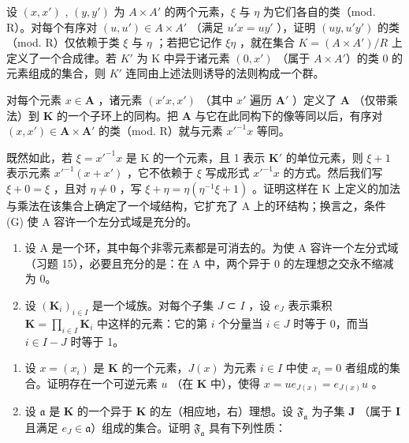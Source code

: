 设 \((x, x')\) , \((y, y')\) 为 \(A \times A'\) 的两个元素，\(\xi\) 与 \(\eta\) 为它们各自的类（mod. R）。对每个有序对 \((u, u') \in A \times A'\) （满足 \(u'x = uy'\) ），证明 \((uy, u'y')\) 的类（mod. R）仅依赖于类 \(\xi\) 与 \(\eta\) ；若把它记作 \(\xi\eta\) ，就在集合 \(K = (A \times A')/R\) 上定义了一个合成律。若 \(K'\) 为 K 中异于诸元素 \((0, x')\) （属于 \(A \times A'\)）的类 0 的元素组成的集合，则 \(K'\) 连同由上述法则诱导的法则构成一个群。

对每个元素 \(x \in \mathbf{A}\) ，诸元素 \((x'x, x')\) （其中 \(x'\) 遍历 \(\mathbf{A}'\) ）定义了 \(\mathbf{A}\) （仅带乘法）到 \(\mathbf{K}\) 的一个子环上的同构。把 \(\mathbf{A}\) 与它在此同构下的像等同以后，有序对 \((x, x') \in \mathbf{A} \times \mathbf{A}'\) 的类（mod. R）就与元素 \(x'^{-1}x\) 等同。

既然如此，若 \(\xi = x'^{-1}x\) 是 K 的一个元素，且 1 表示 \(\mathbf{K}'\) 的单位元素，则 \(\xi + 1\) 表示元素 \(x'^{-1}(x + x')\) ，它不依赖于 \(\xi\) 写成形式 \(x'^{-1}x\) 的方式。然后我们写 \(\xi + 0 = \xi\) ，且对 \(\eta \neq 0\) ，写 \(\xi + \eta = \eta(\eta^{-1}\xi + 1)\) 。证明这样在 K 上定义的加法与乘法在该集合上确定了一个域结构，它扩充了 A 上的环结构；换言之，条件 (G) 使 A 容许一个左分式域是充分的。

\begin{enumerate}
\def\labelenumi{\arabic{enumi}.}
\setcounter{enumi}{15}
\item
  设 A 是一个环，其中每个非零元素都是可消去的。为使 A 容许一个左分式域（习题 15），必要且充分的是：在 A 中，两个异于 0 的左理想之交永不缩减为 0。
\item
  设 \((\mathbf{K}_i)_{i\in I}\) 是一个域族。对每个子集 \(J\) ⊂ \(I\) ，设 \(e_J\) 表示乘积 \(\mathbf{K} = \prod_{i\in I}\mathbf{K}_i\) 中这样的元素：它的第 \(i\) 个分量当 \(i\in J\) 时等于 0，而当 \(i\in I - J\) 时等于 1。
\end{enumerate}

\begin{enumerate}
\def\labelenumi{(\alph{enumi})}
\item
  设 \(x = (x_{i})\) 是 \(\mathbf{K}\) 的一个元素，\(J(x)\) 为元素 \(i \in I\) 中使 \(x_{i} = 0\) 者组成的集合。证明存在一个可逆元素 \(u\) （在 \(\mathbf{K}\) 中），使得 \(x = ue_{J(x)} = e_{J(x)}u\) 。
\item
  设 \(\mathfrak{a}\) 是 \(\mathbf{K}\) 的一个异于 \(\mathbf{K}\) 的左（相应地，右）理想。设 \(\mathfrak{F}_{\mathfrak{a}}\) 为子集 \(\mathbf{J}\) （属于 \(\mathbf{I}\) 且满足 \(e_{J} \in \mathfrak{a}\)）组成的集合。证明 \(\mathfrak{F}_{\mathfrak{a}}\) 具有下列性质：
\end{enumerate}

